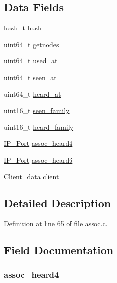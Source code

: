 \subsection*{Data Fields}
\begin{DoxyCompactItemize}
\item 
\hyperlink{assoc_8c_ac2d400520225f5a2aabf44895add81dc}{hash\+\_\+t} \hyperlink{struct_client__entry_a35aa0f6864b81ef3de3d4d46ef823a0c}{hash}
\item 
uint64\+\_\+t \hyperlink{struct_client__entry_aec732782691c39a31d8c579a79a8fed2}{getnodes}
\item 
uint64\+\_\+t \hyperlink{struct_client__entry_aa4c583563fdc794eea3b70dcf92870f4}{used\+\_\+at}
\item 
uint64\+\_\+t \hyperlink{struct_client__entry_ab632ae1b8a283a06d6cb3881c377c6cd}{seen\+\_\+at}
\item 
uint64\+\_\+t \hyperlink{struct_client__entry_a0886ba8c555aa6352f2dbf0606636f13}{heard\+\_\+at}
\item 
uint16\+\_\+t \hyperlink{struct_client__entry_ac06f60c25b78ef1fce357680b1e5701f}{seen\+\_\+family}
\item 
uint16\+\_\+t \hyperlink{struct_client__entry_a1b6b0c24ebf14b86b051d63bd47ffb27}{heard\+\_\+family}
\item 
\hyperlink{struct_i_p___port}{I\+P\+\_\+\+Port} \hyperlink{struct_client__entry_a85c7d2390e7cf32bb433484f958205f1}{assoc\+\_\+heard4}
\item 
\hyperlink{struct_i_p___port}{I\+P\+\_\+\+Port} \hyperlink{struct_client__entry_ae6c8f7476cc280c4f1ef1ea4799e728e}{assoc\+\_\+heard6}
\item 
\hyperlink{struct_client__data}{Client\+\_\+data} \hyperlink{struct_client__entry_a114cded03654e9d27771e24fa1712e39}{client}
\end{DoxyCompactItemize}


\subsection{Detailed Description}


Definition at line 65 of file assoc.\+c.



\subsection{Field Documentation}
\hypertarget{struct_client__entry_a85c7d2390e7cf32bb433484f958205f1}{
\subsubsection[{assoc\+\_\+heard4}]{ assoc\+\_\+heard4}}\label{struct_client__entry_a85c7d2390e7cf32bb433484f958205f1}


